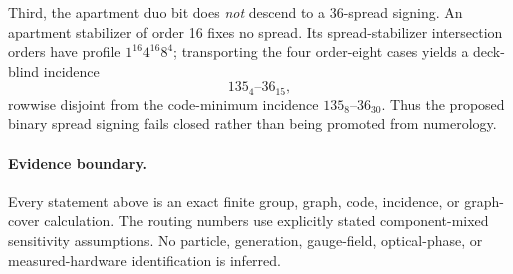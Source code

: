 Third, the apartment duo bit does \emph{not} descend to a 36-spread signing.  An apartment stabilizer of order 16 fixes no spread.  Its spread-stabilizer intersection orders have profile $1^{16}4^{16}8^4$; transporting the four order-eight cases yields a deck-blind incidence
\[
135_4\text{--}36_{15},
\]
rowwise disjoint from the code-minimum incidence $135_8$--$36_{30}$.  Thus the proposed binary spread signing fails closed rather than being promoted from numerology.

\paragraph{Evidence boundary.}
Every statement above is an exact finite group, graph, code, incidence, or graph-cover calculation.  The routing numbers use explicitly stated component-mixed sensitivity assumptions.  No particle, generation, gauge-field, optical-phase, or measured-hardware identification is inferred.
